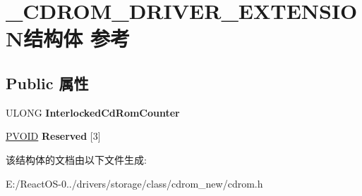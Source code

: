 \hypertarget{struct___c_d_r_o_m___d_r_i_v_e_r___e_x_t_e_n_s_i_o_n}{}\section{\+\_\+\+C\+D\+R\+O\+M\+\_\+\+D\+R\+I\+V\+E\+R\+\_\+\+E\+X\+T\+E\+N\+S\+I\+O\+N结构体 参考}
\label{struct___c_d_r_o_m___d_r_i_v_e_r___e_x_t_e_n_s_i_o_n}
\subsection*{Public 属性}
\begin{DoxyCompactItemize}
\item 
\mbox{\label{struct___c_d_r_o_m___d_r_i_v_e_r___e_x_t_e_n_s_i_o_n_a29b70ce2f312f3fddcdeaff1383cb80d}} 
U\+L\+O\+NG {\bfseries Interlocked\+Cd\+Rom\+Counter}
\item 
\mbox{\label{struct___c_d_r_o_m___d_r_i_v_e_r___e_x_t_e_n_s_i_o_n_a5df1f91b9cd7e907e7030568c17009a9}} 
\hyperlink{interfacevoid}{P\+V\+O\+ID} {\bfseries Reserved} \mbox{[}3\mbox{]}
\end{DoxyCompactItemize}


该结构体的文档由以下文件生成\+:\begin{DoxyCompactItemize}
\item 
E\+:/\+React\+O\+S-\/0../drivers/storage/class/cdrom\+\_\+new/cdrom.\+h\end{DoxyCompactItemize}
